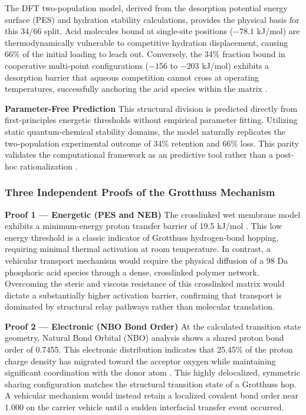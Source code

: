 \documentclass[12pt,a4paper]{report}
\begin{document}
The DFT two-population model, derived from the desorption potential energy surface (PES) and hydration stability calculations, provides the physical basis for this 34/66 split. Acid molecules bound at single-site positions (\(-78.1\) kJ/mol) are thermodynamically vulnerable to competitive hydration displacement, causing 66\% of the initial loading to leach out. Conversely, the 34\% fraction bound in cooperative multi-point configurations (\(-156\) to \(-203\) kJ/mol) exhibits a desorption barrier that aqueous competition cannot cross at operating temperatures, successfully anchoring the acid species within the matrix \cite{63, 64}.

\textbf{Parameter-Free Prediction}
This structural division is predicted directly from first-principles energetic thresholds without empirical parameter fitting. Utilizing static quantum-chemical stability domains, the model naturally replicates the two-population experimental outcome of 34\% retention and 66\% loss. This parity validates the computational framework as an predictive tool rather than a post-hoc rationalization \cite{63, 64, 100}.

\subsubsection{Three Independent Proofs of the Grotthuss Mechanism}
\textbf{Proof 1 — Energetic (PES and NEB)}
The crosslinked wet membrane model exhibits a minimum-energy proton transfer barrier of 19.5 kJ/mol \cite{89,90,91}. This low energy threshold is a classic indicator of Grotthuss hydrogen-bond hopping, requiring minimal thermal activation at room temperature. In contrast, a vehicular transport mechanism would require the physical diffusion of a 98 Da phosphoric acid species through a dense, crosslinked polymer network. Overcoming the steric and viscous resistance of this crosslinked matrix would dictate a substantially higher activation barrier, confirming that transport is dominated by structural relay pathways rather than molecular translation.

\textbf{Proof 2 — Electronic (NBO Bond Order)}
At the calculated transition state geometry, Natural Bond Orbital (NBO) analysis shows a shared proton bond order of 0.7455. This electronic distribution indicates that 25.45\% of the proton charge density has migrated toward the acceptor oxygen while maintaining significant coordination with the donor atom \cite{84,85}. This highly delocalized, symmetric sharing configuration matches the structural transition state of a Grotthuss hop. A vehicular mechanism would instead retain a localized covalent bond order near 1.000 on the carrier vehicle until a sudden interfacial transfer event occurred.
\end{document}
